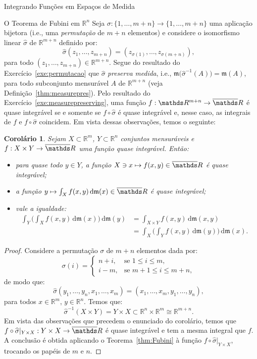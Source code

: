 \documentclass[oneside,final,11pt]{amsbook}
\newcommand{\R}{\mathds R}
\newcommand{\leb}{\mathfrak m}
\newcommand{\dd}{\mathrm d}
\theoremstyle{remark}\newtheorem{exercise}{Exercício}[chapter]
\theoremstyle{remark}\newtheorem{*exercise}[exercise]{\hbox to 0pt{\hskip 0pt minus 1fil*}Exercício}
\theoremstyle{definition}\newtheorem{exdefin}{Definição}[chapter]
\theoremstyle{plain}\newtheorem{teo}{Teorema}[section]
\theoremstyle{plain}\newtheorem{lem}[teo]{Lema}
\theoremstyle{plain}\newtheorem{prop}[teo]{Proposição}
\theoremstyle{plain}\newtheorem{cor}[teo]{Corolário}
\theoremstyle{definition}\newtheorem{defin}[teo]{Definição}
\theoremstyle{remark}\newtheorem{rem}[teo]{Observação}
\theoremstyle{definition}\newtheorem{notation}[teo]{Notação}
\theoremstyle{definition}\newtheorem{convention}[teo]{Convenção}
\theoremstyle{definition}\newtheorem{example}[teo]{Exemplo}
\numberwithin{section}{chapter}
\numberwithin{equation}{section}
\begin{document}
\begin{chapter}{Integrando Funções em Espaços de Medida}
\begin{section}[O Teorema de Fubini em $\R^n$]{O Teorema de Fubini em ${\R^n}$}
Seja $\sigma:\{1,\ldots,m+n\}\to\{1,\ldots,m+n\}$ uma aplicação bijetora (i.e., uma
{\em permutação\/} de $m+n$ elementos) e considere
o isomorfismo linear $\widehat\sigma$ de $\R^{m+n}$ definido por:
\[\widehat\sigma(z_1,\ldots,z_{m+n})=(z_{\sigma(1)},\ldots,z_{\sigma(m+n)}),\]
para todo $(z_1,\ldots,z_{m+n})\in\R^{m+n}$.
Segue do resultado do Exercício~\ref{exe:permutacao} que $\widehat\sigma$ {\em preserva medida},
i.e., $\leb\big(\widehat\sigma^{-1}(A)\big)=\leb(A)$, para todo subconjunto mensurável
$A$ de $\R^{m+n}$ (veja Definição~\ref{thm:measurepres}). Pelo resultado do Exercício~\ref{exe:measurepreserving},
uma função $f:\R^{m+n}\to\overline\R$ é quase integrável se e somente se
$f\circ\widehat\sigma$ é quase integrável e, nesse caso, as integrais de $f$
e $f\circ\widehat\sigma$ coincidem. Em vista dessas observações, temos o seguinte:
\begin{cor}\label{thm:Fubinireverso}
Sejam $X\subset\R^m$, $Y\subset\R^n$ conjuntos mensuráveis e $f:X\times Y\to\overline\R$
uma função quase integrável. Então:
\begin{itemize}
\item para quase todo $y\in Y$, a função $X\ni x\mapsto f(x,y)\in\overline\R$ é
quase integrável;
\item a função $y\mapsto\int_Xf(x,y)\,\dd\leb(x)\in\overline\R$ é
quase integrável;
\item vale a igualdade:
\begin{align*}
\int_Y\Big(\int_Xf(x,y)\,\dd\leb(x)\Big)\,\dd\leb(y)&=\int_{X\times Y}f(x,y)\,\dd\leb(x,y)\\
&=\int_X\Big(\int_Yf(x,y)\,\dd\leb(y)\Big)\,\dd\leb(x).
\end{align*}
\end{itemize}
\end{cor}
\begin{proof}
Considere a permutação $\sigma$ de $m+n$ elementos dada por:
\[\sigma(i)=\begin{cases}
n+i,&\text{se $1\le i\le m$},\\
i-m,&\text{se $m+1\le i\le m+n$},
\end{cases}\]
de modo que:
\[\widehat\sigma(y_1,\ldots,y_n,x_1,\ldots,x_m)=(x_1,\ldots,x_m,y_1,\ldots,y_n),\]
para todos $x\in\R^m$, $y\in\R^n$. Temos que:
\[\widehat\sigma^{-1}(X\times Y)=Y\times X\subset\R^n\times\R^m\cong\R^{m+n}.\]
Em vista das observações que precedem o enunciado
do corolário, temos que $f\circ\widehat\sigma\vert_{Y\times X}:Y\times X\to\overline\R$ é quase integrável
e tem a mesma integral que $f$. A conclusão é obtida aplicando o Teorema~\ref{thm:Fubini}
à função $f\circ\widehat\sigma\vert_{Y\times X}$, trocando os papéis de $m$ e $n$.
\end{proof}


\end{section}
\end{chapter}
\end{document}
